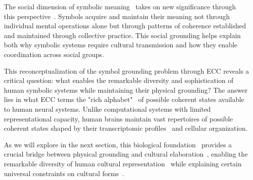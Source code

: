 The social dimension of symbolic meaning~ takes on new significance through this perspective~\cite{hutchins1995cognition,descola2005beyond}. Symbols acquire and maintain their meaning not through individual mental operations alone but through patterns of coherence established and maintained through collective practice. This social grounding helps explain both why symbolic systems require cultural transmission and how they enable coordination across social groups.

This reconceptualization of the symbol grounding problem through ECC reveals a critical question: what enables the remarkable diversity and sophistication of human symbolic systems while maintaining their physical grounding? The answer lies in what ECC terms the "rich alphabet"~ of possible coherent states available to human neural systems. Unlike computational systems with limited representational capacity, human brains maintain vast repertoires of possible coherent states shaped by their transcriptomic profiles~ and cellular organization.

As we will explore in the next section, this biological foundation~ provides a crucial bridge between physical grounding and cultural elaboration~\cite{shore1996culture,wagner2016invention}, enabling the remarkable diversity of human cultural representation~ while explaining certain universal constraints on cultural forms~.
